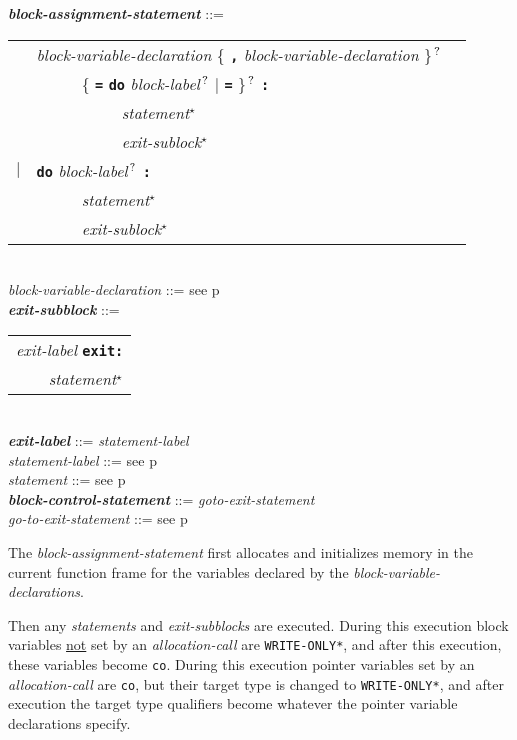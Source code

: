\documentclass[12pt]{article}
\newcommand{\TT}[1]{{\tt \bfseries #1}}
\newcommand{\STAR}{{\Large $^\star$}}
\newcommand{\QMARK}{{$^{\,\mbox{\footnotesize ?}}$}}
\newcommand{\ttkey}[1]{{\tt \bfseries #1}}
\newcommand{\emkey}[1]{{\em \bfseries #1}}
\newcommand{\pagref}[1]{p\pageref{#1}}
\newcommand{\EOL}{\penalty \exhyphenpenalty}
\newenvironment{indpar}[1][0.3in]%
	{\begin{list}{}%
		     {\setlength{\itemsep}{0in}%
		      \setlength{\topsep}{0in}%
		      \setlength{\parsep}{1ex}%
		      \setlength{\labelwidth}{#1}%
		      \setlength{\leftmargin}{#1}%
		      \addtolength{\leftmargin}{\labelsep}}%
	 \item}%
	{\end{list}}
\begin{document}
\begin{indpar}
\emkey{block-assignment-statement} ::= \\
\hspace*{0.5in}
    \begin{tabular}[t]{@{}rll}
        & {\em block-variable-declaration}
                \{ \TT{,} {\em block-variable-declaration} \}\QMARK{} \\
	& ~~~~~ \{ \TT{=}
	           \ttkey{do} {\em block-label}\QMARK{} $|$ \TT{=} \}\QMARK{}
		   \TT{:} \\
        & ~~~~~~~~~~ {\em statement}\STAR{} \\
        & ~~~~~~~~~~ {\em exit-sublock}\STAR{} \\
    $|$ & \ttkey{do} {\em block-label}\QMARK{} \TT{:} \\
        & ~~~~~ {\em statement}\STAR{} \\
        & ~~~~~ {\em exit-sublock}\STAR{} \\
    \end{tabular}
\\[0.5ex]
{\em block-variable-declaration} ::=
    see \pagref{BLOCK-VARIABLE-DECLARATION}
\\[0.5ex]
\emkey{exit-subblock}\label{EXIT-SUBBLOCK} ::=
    \begin{tabular}[t]{l}
    {\em exit-label} \ttkey{exit}\TT{:} \\
    \TT{~~~~}{\em statement}\STAR{} \\
    \end{tabular} \\
\emkey{exit-label} ::= {\em statement-label}
\\[0.5ex]
{\em statement-label} ::= see \pagref{STATEMENT-LABEL} \\
{\em statement} ::= see \pagref{STATEMENT} \\
\emkey{block-control-statement}\label{BLOCK-CONTROL-STATEMENT}
	::= {\em goto-exit-statement} \\
{\em go-to-exit-statement} ::= see \pagref{GO-TO-STATEMENT}
\end{indpar}

The {\em block-assignment-statement}
first allocates and initializes memory in the current function frame
for the variables declared by the {\em block-variable-declarations}.

Then any {\em statements} and
{\em exit-subblocks} are executed.  During this execution
block variables \underline{not} set by an {\em allocation-call}
are {\tt *WRITE-\EOL ONLY*}, and after this execution, these variables become
{\tt co}.  During this execution pointer variables set by
an {\em allocation-call} are {\tt co}, but their target type is changed
to {\tt *WRITE-\EOL ONLY*}, and after execution the target type
qualifiers become whatever the pointer variable declarations specify.
\end{document}
